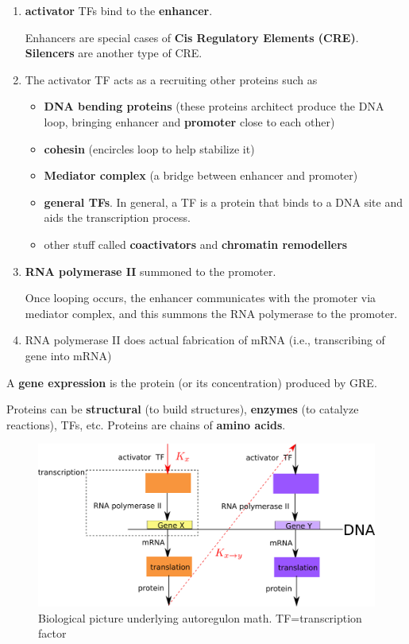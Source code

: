 \begin{enumerate}
\item {\bf activator}  TFs  bind to the {\bf enhancer}.

Enhancers are special cases of {\bf Cis Regulatory 
Elements (CRE)}. {\bf Silencers} are another type of CRE.

\item The activator TF 
acts as a  recruiting other 
proteins such as

\begin{itemize}[\checkmark]
\item {\bf DNA bending proteins} (these proteins
architect produce the DNA loop,
bringing  enhancer and {\bf promoter} close to each other)
\item {\bf cohesin} (encircles loop to help stabilize it)
\item {\bf Mediator complex} (a bridge between enhancer and promoter)
\item {\bf general TFs}. In general, a TF is a protein that binds to a DNA site and aids the transcription process.
\item other stuff called {\bf coactivators} and {\bf chromatin remodellers}
\end{itemize}

\item {\bf RNA polymerase II} summoned to the
promoter.

Once looping occurs, the enhancer communicates with the promoter via mediator
complex, and this summons the RNA polymerase to the promoter.

\item RNA polymerase II does actual fabrication of mRNA (i.e., transcribing of gene into mRNA)
  
\end{enumerate}

A {\bf gene expression} is the protein (or its concentration) produced by GRE.

Proteins can be {\bf structural} (to build structures), {\bf enzymes} (to catalyze reactions), TFs, etc. Proteins
are chains of {\bf amino acids}.

\begin{figure}[h!]
\centering
\includegraphics[width=5in]
{autoregulons/autoreg-bio.png}
\caption{Biological picture underlying
autoregulon math.  TF=transcription factor}
\label{fig-autoreg-bio}
\end{figure}

